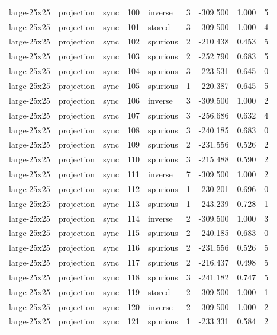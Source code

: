 \begin{tabular}{lllrlrrrr}
large-25x25 & projection & sync & 100 & inverse & 3 & -309.500 & 1.000 & 5 \\
large-25x25 & projection & sync & 101 & stored & 3 & -309.500 & 1.000 & 4 \\
large-25x25 & projection & sync & 102 & spurious & 2 & -210.438 & 0.453 & 5 \\
large-25x25 & projection & sync & 103 & spurious & 2 & -252.790 & 0.683 & 5 \\
large-25x25 & projection & sync & 104 & spurious & 3 & -223.531 & 0.645 & 0 \\
large-25x25 & projection & sync & 105 & spurious & 1 & -220.387 & 0.645 & 5 \\
large-25x25 & projection & sync & 106 & inverse & 3 & -309.500 & 1.000 & 2 \\
large-25x25 & projection & sync & 107 & spurious & 3 & -256.686 & 0.632 & 4 \\
large-25x25 & projection & sync & 108 & spurious & 3 & -240.185 & 0.683 & 0 \\
large-25x25 & projection & sync & 109 & spurious & 2 & -231.556 & 0.526 & 2 \\
large-25x25 & projection & sync & 110 & spurious & 3 & -215.488 & 0.590 & 2 \\
large-25x25 & projection & sync & 111 & inverse & 7 & -309.500 & 1.000 & 2 \\
large-25x25 & projection & sync & 112 & spurious & 1 & -230.201 & 0.696 & 0 \\
large-25x25 & projection & sync & 113 & spurious & 1 & -243.239 & 0.728 & 1 \\
large-25x25 & projection & sync & 114 & inverse & 2 & -309.500 & 1.000 & 3 \\
large-25x25 & projection & sync & 115 & spurious & 2 & -240.185 & 0.683 & 0 \\
large-25x25 & projection & sync & 116 & spurious & 2 & -231.556 & 0.526 & 5 \\
large-25x25 & projection & sync & 117 & spurious & 2 & -216.437 & 0.498 & 5 \\
large-25x25 & projection & sync & 118 & spurious & 3 & -241.182 & 0.747 & 5 \\
large-25x25 & projection & sync & 119 & stored & 2 & -309.500 & 1.000 & 1 \\
large-25x25 & projection & sync & 120 & inverse & 2 & -309.500 & 1.000 & 2 \\
large-25x25 & projection & sync & 121 & spurious & 1 & -233.331 & 0.584 & 2 \\

\end{tabular}
